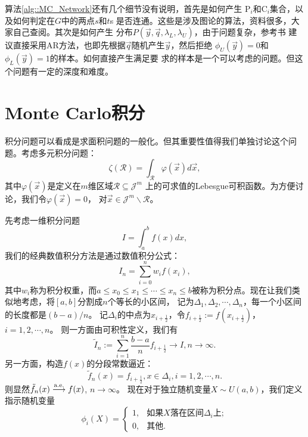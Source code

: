 算法\ref{alg::MC_Network}还有几个细节没有说明，首先是如何产生
$\mathrm{P}_i$和$\mathrm{C}_i$集合，以及如何判定在$G$中的两点$s$和$t$s
是否连通。这些是涉及图论的算法，资料很多，大家自己查阅。其次是如何产生
分布$P(\vec{y}, \vec{q}, \lambda_L, \lambda_U)$，由于问题复杂，参考书
建议直接采用AR方法，也即先根据$\vec{q}$随机产生$\vec{y}$，然后拒绝
$\phi_U(\vec{y}) = 0$和$\phi_L(\vec{y}) = 1$的样本。如何直接产生满足要
求的样本是一个可以考虑的问题。但这个问题有一定的深度和难度。

\section{Monte Carlo积分}

积分问题可以看成是求面积问题的一般化。但其重要性值得我们单独讨论这个问
题。考虑多元积分问题：
\begin{equation}
  \zeta(\mathscr{R}) = \int_{\mathscr{R}}\varphi(\vec{x}) d\vec{x},
  \label{eq::mc_integeration}
\end{equation}
其中$\varphi(\vec{x})$是定义在$m$维区域$\mathscr{R} \subseteq \mathscr{J}^m$
上的可求值的Lebesgue可积函数。为方便讨论，我们令$\varphi(\vec{x}) = 0$，
对$\vec{x} \in \mathscr{J}^m \backslash \mathscr{R}$。

先考虑一维积分问题
$$
I = \int_a^b f(x) dx,
$$
我们的经典数值积分方法是通过数值积分公式：
$$
I_n = \sum_{i = 0}^n w_if(x_i),
$$
其中$w_i$称为积分权重，而$a \leq x_0 \leq x_1 \leq \cdots \leq x_n
\leq b$被称为积分点。现在让我们类似地考虑，将$[a, b]$分割成$n$个等长的小区间，
记为$\Delta_1, \Delta_2, \cdots, \Delta_n$，每一个小区间的长度都是$(b - a) / n$。
记$\Delta_i$的中点为$x_{i + \frac{1}{2}}$，令$f_{i + \frac{1}{2}} := f(x_{i + \frac{1}{2}})$，$i = 1, 2, \cdots, n$。
则一方面由可积性定义，我们有
\begin{equation}
  \tilde{I}_n := \sum_{i = 1}^n \frac{b - a}{n}f_{i + \frac{1}{2}} \to I, n \to \infty.
  \label{eq::MC_integeration_eI}
\end{equation}
另一方面，构造$f(x)$的分段常数逼近：
\begin{equation}
  \tilde{f}_n(x) = f_{i + \frac{1}{2}}, x \in \Delta_i, i = 1, 2, \cdots, n.
  \label{eq::MC_approximation_kernel}
\end{equation}
则显然$\tilde{f}_n(x) \stackrel{\mathrm{\tiny a. e.}}\longrightarrow  f(x)$, $n \to \infty$。
现在对于独立随机变量$X \sim U(a, b)$，我们定义指示随机变量
$$
 \phi_i(X) = \left\{
 \begin{array}{ll}
   1, & \mbox{如果$X$落在区间$\Delta_i$上};\\
   0, & \mbox{其他}.
 \end{array}
 \right.
 $$

